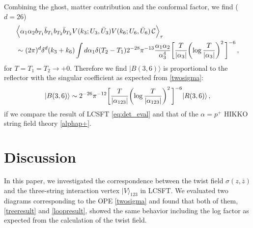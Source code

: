 \documentclass[12pt]{article}
\begin{document}
Combining the ghost, matter contribution and the conformal factor, we
find ($d=26$)
\begin{align}
&\Big\langle\alpha_1\alpha_2
b_{T_1}\bar{b}_{T_1}b_{T_2}\bar{b}_{T_2}
V(k_3;U_3,\bar{U}_3)V(k_6;U_6,\bar{U}_6)\,{\cal C}\Big\rangle_\tau
\nonumber\\
&\sim(2\pi)^d\delta^d(k_3+k_6)\int d\alpha_1
\delta(T_2-T_1)2^{-28}\pi^{-13}
\frac{\alpha_1\alpha_2}{\alpha_3^4}
\biggl[{T\over|\alpha_3|}
\biggl(\log{T\over|\alpha_3|}\biggr)^2\,\biggr]^{-6}\,,
\label{alphap+}
\end{align}
for $T=T_1=T_2\to +0$.
Therefore we find $|B(3,6)\rangle$ is proportional to the reflector
with the singular coefficient as expected from \eqref{twosigma}:
\begin{align}
|B(3,6)\rangle\sim
2^{-26}\pi^{-12}
\biggl[{T\over|\alpha_{123}|}
\biggl(\log{T\over |\alpha_{123}|}\biggr)^2\,\biggr]^{-6}
|R(3,6)\rangle\,,\label{loopresult}
\end{align}
if we compare the result of LCSFT \eqref{eq:det_eval} and that of the 
$\alpha=p^+$ HIKKO string field theory \eqref{alphap+}.

\section{Discussion}
In this paper, we investigated the correspondence between the twist
field $\sigma(z,\bar z)$ and the three-string interaction vertex
$|V\rangle_{123}$ in LCSFT.
We evaluated two diagrams corresponding to the OPE \eqref{twosigma}
and found that both of them, \eqref{treeresult} and
\eqref{loopresult}, showed the same behavior including the log factor
as expected from the calculation of the twist field.
\end{document}
